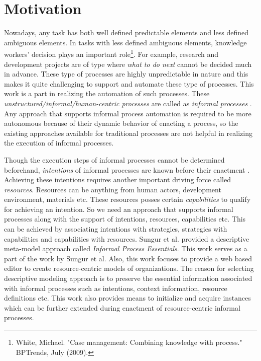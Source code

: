 \section{Motivation}
\label{sec:motivation}
Nowadays, any task has both well defined predictable elements and less defined ambiguous elements. In tasks with less defined ambiguous elements, knowledge workers' decision plays an important role\footnote{White, Michael. "Case management: Combining knowledge with process." BPTrends, July (2009).}. For example, research and development projects are of type where \textit{what to do next} cannot be decided much in advance. These type of processes are highly unpredictable in nature and this makes it quite challenging to support and automate these type of processes. This work is a part in realizing the automation of such processes. These \textit{unstructured/informal/human-centric processes} are called as \textit{informal processes} \cite{Sungur2014}. Any approach that supports informal process automation is required to be more autonomous because of their dynamic behavior of enacting a process, so the existing approaches available for traditional processes are not helpful in realizing the execution of informal processes.  

Though the execution steps of informal processes cannot be determined beforehand, \textit{intentions} of informal processes are known before their enactment \cite{Sungur2015}. Achieving these intentions requires another important driving force called \textit{resources}. Resources can be anything from human actors, development environment, materials etc. These resources posses certain \textit{capabilities} to qualify for achieving an intention. So we need an approach that supports informal processes along with the support of intentions, resources, capabilities etc. This can be achieved by associating intentions with strategies, strategies with capabilities and capabilities with resources. Sungur et al. \cite{Sungur2014a} provided a descriptive meta-model approach called \textit{Informal Process Essentials}. This work serves as a part of the work by Sungur et al. Also, this work focuses to provide a web based editor to create resource-centric models of organizations. The reason for selecting descriptive modeling approach is to preserve the essential information associated with informal processes such as intentions, context information, resource definitions etc.  This work also provides means to initialize and acquire instances which can be further extended during enactment of resource-centric informal processes.  


